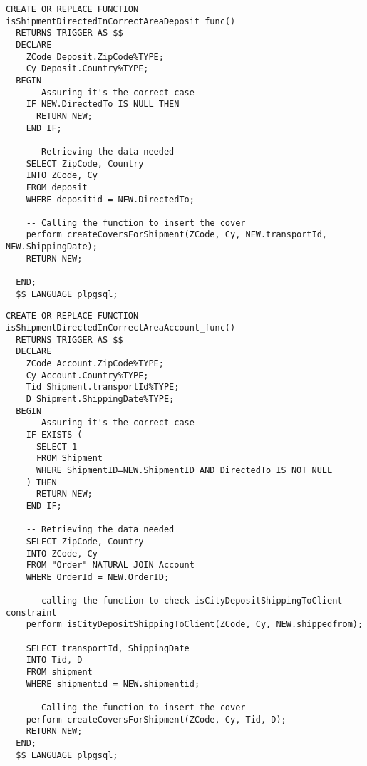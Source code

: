 \begin{lstlisting}[caption={Funzione per le spedizioni verso depositi}]
  CREATE OR REPLACE FUNCTION isShipmentDirectedInCorrectAreaDeposit_func() 
  RETURNS TRIGGER AS $$
  DECLARE 
    ZCode Deposit.ZipCode%TYPE;
    Cy Deposit.Country%TYPE;
  BEGIN 
    -- Assuring it's the correct case
    IF NEW.DirectedTo IS NULL THEN 
      RETURN NEW;
    END IF;

    -- Retrieving the data needed
    SELECT ZipCode, Country 
    INTO ZCode, Cy
    FROM deposit
    WHERE depositid = NEW.DirectedTo;

    -- Calling the function to insert the cover
    perform createCoversForShipment(ZCode, Cy, NEW.transportId, NEW.ShippingDate);
    RETURN NEW;

  END;
  $$ LANGUAGE plpgsql;
\end{lstlisting}

\begin{lstlisting}[caption={Funzione per le spedizioni verso clienti}]
  CREATE OR REPLACE FUNCTION isShipmentDirectedInCorrectAreaAccount_func() 
  RETURNS TRIGGER AS $$
  DECLARE 
    ZCode Account.ZipCode%TYPE;
    Cy Account.Country%TYPE;
    Tid Shipment.transportId%TYPE;
    D Shipment.ShippingDate%TYPE;
  BEGIN 
    -- Assuring it's the correct case
    IF EXISTS (
      SELECT 1
      FROM Shipment
      WHERE ShipmentID=NEW.ShipmentID AND DirectedTo IS NOT NULL
    ) THEN
      RETURN NEW;
    END IF;
  
    -- Retrieving the data needed
    SELECT ZipCode, Country 
    INTO ZCode, Cy
    FROM "Order" NATURAL JOIN Account
    WHERE OrderId = NEW.OrderID;

    -- calling the function to check isCityDepositShippingToClient constraint
    perform isCityDepositShippingToClient(ZCode, Cy, NEW.shippedfrom);
  
    SELECT transportId, ShippingDate
    INTO Tid, D
    FROM shipment
    WHERE shipmentid = NEW.shipmentid;
  
    -- Calling the function to insert the cover
    perform createCoversForShipment(ZCode, Cy, Tid, D);
    RETURN NEW;
  END;
  $$ LANGUAGE plpgsql;
\end{lstlisting}



